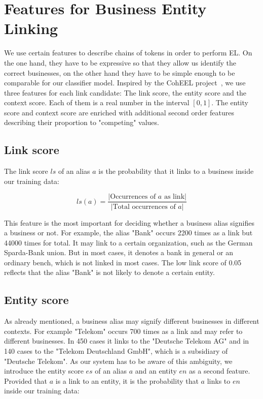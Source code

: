 \section{Features for Business Entity Linking}
\label{sec:features}
We use certain features to describe chains of tokens in order to perform EL. On the one hand, they have to be expressive so that they allow us identify the correct businesses, on the other hand they have to be simple enough to be comparable for our classifier model. Inspired by the CohEEL project~\cite{coheel}, we use three features for each link candidate: The link score, the entity score and the context score. Each of them is a real number in the interval $[0, 1]$. The entity score and context score are enriched with additional second order features describing their proportion to "competing" values.



\subsection{Link score}
\label{sec:link_score}
The link score $ls$ of an alias $a$ is the probability that it links to a business inside our training data:

\begin{equation*} %
ls(a) = \frac{|\text{Occurrences of $a$ as link}|}{|\text{Total occurrences of $a$}|}
\end{equation*}

This feature is the most important for deciding whether a business alias signifies a business or not. For example, the alias "Bank" occurs 2200 times as a link but 44000 times for total. It may link to a certain organization, such as the German Sparda-Bank union. But in most cases, it denotes a bank in general or an ordinary bench, which is not linked in most cases. The low link score of 0.05 reflects that the alias "Bank" is not likely to denote a certain entity.\\



\subsection{Entity score}
\label{sec:entity_score}
As already mentioned, a business alias may signify different businesses in different contexts. For example "Telekom" occurs 700 times as a link and may refer to different businesses. In 450 cases it links to the "Deutsche Telekom AG" and in 140 cases to the "Telekom Deutschland GmbH", which is a subsidiary of "Deutsche Telekom".\footnotemark{} As our system has to be aware of this ambiguity, we introduce the entity score $es$ of an alias $a$ and an entity $en$ as a second feature. Provided that $a$ is a link to an entity, it is the probability that $a$ links to $en$ inside our training data:

